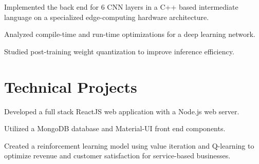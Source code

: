 \documentclass[]{deedy-resume-openfont}
\begin{document}
\begin{minipage}[t]{0.66\textwidth}
\begin{tightemize}
    \item Implemented the back end for 6 CNN layers in a C++ based intermediate language on a specialized edge-computing hardware architecture.
    \item Analyzed compile-time and run-time optimizations for a deep learning network.
    \item Studied post-training weight quantization to improve inference efficiency.
\end{tightemize}
\sectionsep


\section{Technical Projects}
\begin{tightemize}
    \item Developed a full stack ReactJS web application with a Node.js web server.
    \item Utilized a MongoDB database and Material-UI front end components.
\end{tightemize}
\sectionsep


\begin{tightemize}
    \item Created a reinforcement learning model using value iteration and Q-learning to optimize revenue and customer satisfaction for service-based businesses.
\end{tightemize}
\sectionsep


\end{minipage}
\end{document}

